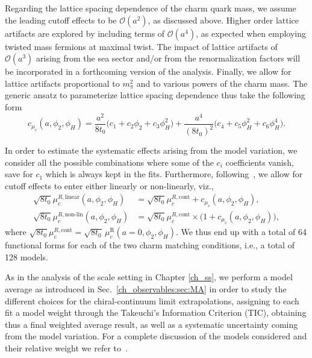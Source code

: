 Regarding the lattice spacing dependence of the charm quark mass, we assume the leading cutoff effects to 
be $\mathcal{O}(a^2)$, as discussed above. Higher order lattice artifacts are explored by including terms of $\mathcal{O}(a^4)$, as expected when employing twisted mass fermions at maximal twist. The impact of lattice artifacts of $\mathcal{O}(a^3)$ arising from the sea sector and/or from the renormalization factors will be incorporated in a forthcoming version of the analysis. Finally, we allow for lattice artifacts  proportional to $m_{\pi}^2$ and to various powers of the charm mass. The generic ansatz to parameterize lattice spacing dependence thus take the following form
\begin{equation}
	c_{\mu_c}(a, \phi_2, \phi_H) = \frac{a^2}{8t_0} \big(
	c_1 + c_2\phi_2 + c_3 \phi_H^2
	\big)
	+
	\frac{a^4}{(8t_0)^2}\big(
	c_4 + c_5\phi_H^2 + c_6 \phi_H^4
	\big).
	\label{eq:lattice_spacing_dependence}
\end{equation} 

In order to estimate the systematic effects arising from the model variation, we consider all the possible 
combinations where some of the $c_i$ coefficients vanish, save for $c_1$ which is always kept in the fits.
Furthermore, following~\cite{Heitger:2021apz}, we allow for cutoff effects to enter either linearly or 
non-linearly, viz.,
  \begin{align} 	\label{eq:tot_model}
 	\sqrt{8t_0}\mu_c^{R,\text{linear}}(a, \phi_2,\phi_H) &=
 	\sqrt{8t_0}\mu_c^{R,\text{cont}} + c_{\mu_c}(a, \phi_2,\phi_H),
 	\\
 	\sqrt{8t_0}\mu_c^{R,\text{non-lin}}(a, \phi_2,\phi_H) &=
 	\sqrt{8t_0}\mu_c^{R,\text{cont}} \times\big(1+ c_{\mu_c}(a, \phi_2,\phi_H)\big), \nonumber
 \end{align}
where $\sqrt{8t_0}\mu_c^{R,\text{cont}}=\sqrt{8t_0}\, \mu_c^{\textrm{R}}(a=0, \phi_2, \phi_H)$. We thus end up with a total of 64 functional forms for each of the two charm matching conditions,
i.e., a total of 128 models.

As in the analysis of the scale setting in Chapter \ref{ch_ss}, we perform a model average as introduced in Sec.~\ref{ch_observables:sec:MA} in order to study the different choices for the chiral-continuum limit extrapolations, assigning to each fit a model weight through the Takeuchi's Information Criterion (TIC), obtaining thus a final weighted average result, as well as a systematic uncertainty coming from the model variation. For a complete discussion of the models considered and their relative weight we refer to~\citep{charm}.

